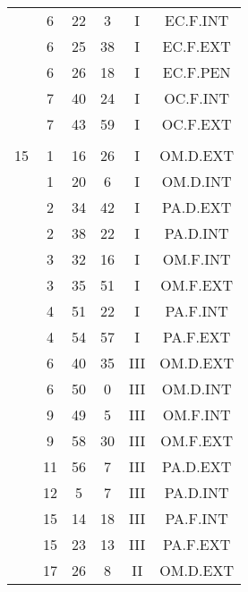 \documentclass[12pt, a4paper]{article}
\begin{document}
\begin{multicols}{3}
{\begin{tabular}{c c c c c c}
	 	 	 	 & 6 & 22 & 3 & I & EC.F.INT\\%
	 	 	 	 & 6 & 25 & 38 & I & EC.F.EXT\\%
	 	 	 	 & 6 & 26 & 18 & I & EC.F.PEN\\%
	 	 	 	 & 7 & 40 & 24 & I & OC.F.INT\\%
	 	 	 	 & 7 & 43 & 59 & I & OC.F.EXT\\%
	 	 	 	 & & & & & \\%
	 	 	 	15 & 1 & 16 & 26 & I & OM.D.EXT\\%
	 	 	 	 & 1 & 20 & 6 & I & OM.D.INT\\%
	 	 	 	 & 2 & 34 & 42 & I & PA.D.EXT\\%
	 	 	 	 & 2 & 38 & 22 & I & PA.D.INT\\%
	 	 	 	 & 3 & 32 & 16 & I & OM.F.INT\\%
	 	 	 	 & 3 & 35 & 51 & I & OM.F.EXT\\%
	 	 	 	 & 4 & 51 & 22 & I & PA.F.INT\\%
	 	 	 	 & 4 & 54 & 57 & I & PA.F.EXT\\%
	 	 	 	 & 6 & 40 & 35 & III & OM.D.EXT\\%
	 	 	 	 & 6 & 50 & 0 & III & OM.D.INT\\%
	 	 	 	 & 9 & 49 & 5 & III & OM.F.INT\\%
	 	 	 	 & 9 & 58 & 30 & III & OM.F.EXT\\%
	 	 	 	 & 11 & 56 & 7 & III & PA.D.EXT\\%
	 	 	 	 & 12 & 5 & 7 & III & PA.D.INT\\%
	 	 	 	 & 15 & 14 & 18 & III & PA.F.INT\\%
	 	 	 	 & 15 & 23 & 13 & III & PA.F.EXT\\%
	 	 	 	 & 17 & 26 & 8 & II & OM.D.EXT\\%

\end{tabular}}
\end{multicols}
\end{document}
